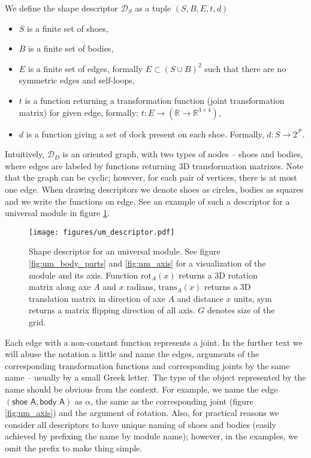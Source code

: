 We define the shape descriptor $\mathcal{D}_S$ as a tuple $(S, B, E, t, d)$
\begin{itemize}
    \item $S$ is a finite set of shoes,
    \item $B$ is a finite set of bodies,
    \item $E$ is a finite set of edges, formally $E \subset (S\cup B)^2$ such
    that there are no symmetric edges and self-loops,
    \item $t$ is a function returning a transformation function (joint
    transformation matrix) for given edge, formally: $t:
    E\rightarrow(\mathds{R}\rightarrow\mathds{R}^{4\times4})$,
    \item $d$ is a function giving a set of dock present on each shoe. Formally,
    $d: S\rightarrow 2^\mathcal{P}$.
\end{itemize}
Intuitively, $\mathcal{D}_D$ is an oriented graph, with two types of nodes --
shoes and bodies, where edges are labeled by functions returning 3D
transformation matrixes. Note that the graph can be cyclic; however, for each
pair of vertices, there is at most one edge. When drawing descriptors we denote
shoes as circles, bodies as squares and we write the functions on edge. See
an example of such a descriptor for a universal module in figure
\ref{fig:um_descriptor}.

\begin{figure}[t]
    \centering
    \texttt{[image: figures/um\_descriptor.pdf]}
    \caption{Shape descriptor for an universal module. See figure
    \ref{fig:um_body_parts} and \ref{fig:um_axis} for a visualization of the
    module and its axis. Function $\text{rot}_A(x)$ returns a 3D rotation matrix
    along axe $A$ and $x$ radians, $\text{trans}_A(x)$ returns a 3D translation
    matrix in direction of axe $A$ and distance $x$ units, $\text{sym}$ returns
    a matrix flipping direction of all axis. $G$ denotes size of the grid.}
    \label{fig:um_descriptor}
\end{figure}

Each edge with a non-constant function represents a joint. In the further text
we will abuse the notation a little and name the edges, arguments of the
corresponding transformation functions and corresponding joints by the same name
-- usually by a small Greek letter. The type of the object represented by the
name should be obvious from the context. For example, we name the edge
$(\textsf{shoe A}, \textsf{body A})$ as $\alpha$, the same as the corresponding
joint (figure \ref{fig:um_axis}) and the argument of rotation. Also, for
practical reasons we consider all descriptors to have unique naming of shoes and
bodies (easily achieved by prefixing the name by module name); however, in the
examples, we omit the prefix to make thing simple.


